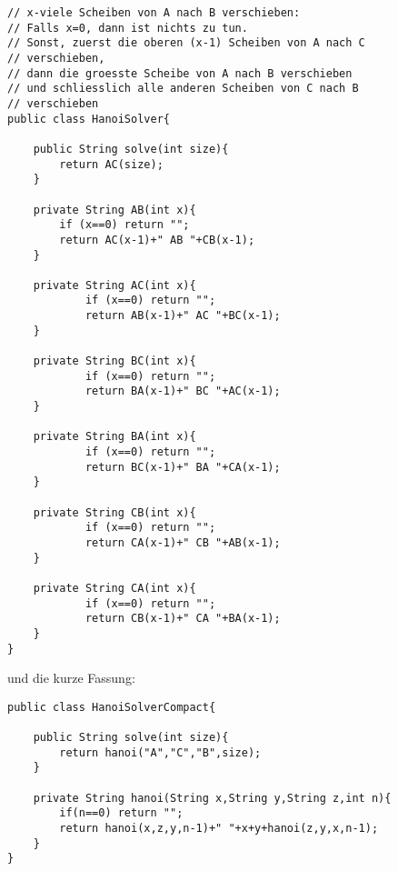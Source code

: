 \begin{example}
\begin{remark}
\lstset{language=Java}
\begin{framed}
\begin{lstlisting}
// x-viele Scheiben von A nach B verschieben:
// Falls x=0, dann ist nichts zu tun.
// Sonst, zuerst die oberen (x-1) Scheiben von A nach C
// verschieben,
// dann die groesste Scheibe von A nach B verschieben
// und schliesslich alle anderen Scheiben von C nach B
// verschieben
public class HanoiSolver{

    public String solve(int size){
        return AC(size);
    }

    private String AB(int x){
        if (x==0) return "";
        return AC(x-1)+" AB "+CB(x-1);
    }

    private String AC(int x){
            if (x==0) return "";
            return AB(x-1)+" AC "+BC(x-1);
    }

    private String BC(int x){
            if (x==0) return "";
            return BA(x-1)+" BC "+AC(x-1);
    }

    private String BA(int x){
            if (x==0) return "";
            return BC(x-1)+" BA "+CA(x-1);
    }

    private String CB(int x){
            if (x==0) return "";
            return CA(x-1)+" CB "+AB(x-1);
    }

    private String CA(int x){
            if (x==0) return "";
            return CB(x-1)+" CA "+BA(x-1);
    }
}
\end{lstlisting}
\end{framed}
und die kurze Fassung:
\begin{framed}
\begin{lstlisting}
public class HanoiSolverCompact{

    public String solve(int size){
        return hanoi("A","C","B",size);
    }

    private String hanoi(String x,String y,String z,int n){
        if(n==0) return "";
        return hanoi(x,z,y,n-1)+" "+x+y+hanoi(z,y,x,n-1);
    }
}
\end{lstlisting}
\end{framed}

%
%
%
%
%
%
\end{remark}
\end{example}



